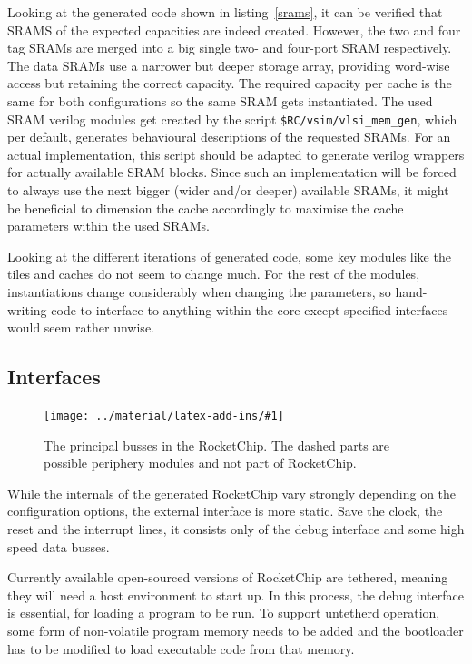 \documentclass[journal,a4paper]{IEEEtran}
\newcommand*{\COMPILEIMAGES}{}%
\newcommand\inputimage[1]{%
	\ifdefined\COMPILEIMAGES
		
	\else
		\texttt{[image: ../material/latex-add-ins/\#1]}
	\fi
}
\newlength{\savedtextfloatsep}
\begin{document}
Looking at the generated code shown in listing~\ref{srams}, it can be verified that SRAMS of the expected capacities are indeed created.
However, the two and four tag SRAMs are merged into a big single two- and four-port SRAM respectively.
The data SRAMs use a narrower but deeper storage array, providing word-wise access but retaining the correct capacity. The required capacity per cache is the same for both configurations so the same SRAM gets instantiated.
The used SRAM verilog modules get created by the script \texttt{\$RC/vsim/vlsi\_mem\_gen}, which per default, generates behavioural descriptions of the requested SRAMs.
For an actual implementation, this script should be adapted to generate verilog wrappers for actually available SRAM blocks.
Since such an implementation will be forced to always use the next bigger (wider and/or deeper) available SRAMs, it might be beneficial to dimension the cache accordingly to maximise the cache parameters within the used SRAMs.

Looking at the different iterations of generated code, some key modules like the tiles and caches do not seem to change much.
For the rest of the modules, instantiations change considerably when changing the parameters, so hand-writing code to interface to anything within the core except specified interfaces would seem rather unwise.

\subsection{Interfaces}

		\setlength{\textfloatsep}{\savedtextfloatsep}
\begin{figure}%
	\centering
	\inputimage{image4}
	\caption{The principal busses in the RocketChip. The dashed parts are possible periphery modules and not part of RocketChip.}
	\label{busses}
\end{figure}
While the internals of the generated RocketChip vary strongly depending on the configuration options, the external interface is more static.
Save the clock, the reset and the interrupt lines, it consists only of the debug interface and some high speed data busses.

Currently available open-sourced versions of RocketChip are tethered\cite{tether}, meaning they will need a host environment to start up.
In this process, the debug interface is essential, for loading a program to be run.
To support untetherd operation, some form of non-volatile program memory needs to be added and the bootloader has to be modified to load executable code from that memory.
\end{document}
